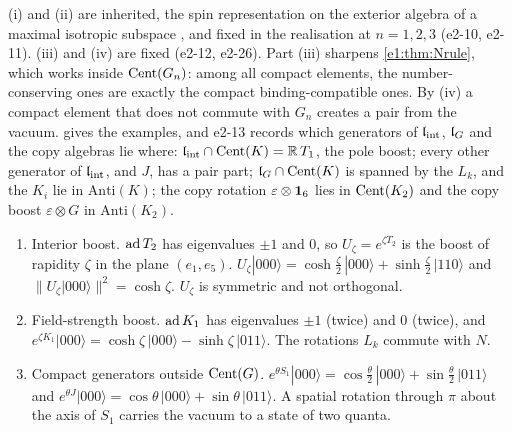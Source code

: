 (i) and (ii) are inherited, the spin representation on the exterior algebra of a maximal isotropic subspace \cite{Chevalley54}, and fixed
in the realisation at $n=1,2,3$ (e2-10, e2-11). (iii) and (iv) are fixed (e2-12, e2-26). Part (iii) sharpens \cref{e1:thm:Nrule}, which works
inside $\operatorname{Cent}(G_n)$: among all compact elements, the number-conserving ones are exactly the compact binding-compatible ones. By (iv) a
compact element that does not commute with $G_n$ creates a pair from the vacuum.  gives the examples, and
e2-13 records which generators of $\mathfrak l_{\rm int}$, $\mathfrak l_G$ and the copy algebras lie where: $\mathfrak l_{\rm int}\cap\operatorname{Cent}(K)=\mathbb{R}\,T_1$, the pole boost; every
other generator of $\mathfrak l_{\rm int}$, and $J$, has a pair part; $\mathfrak l_G\cap\operatorname{Cent}(K)$ is spanned by the $L_k$, and the $K_i$ lie in $\mathrm{Anti}(K)$; the copy
rotation $\varepsilon\otimes\mathbf 1_6$ lies in $\operatorname{Cent}(K_2)$ and the copy boost $\varepsilon\otimes G$ in $\mathrm{Anti}(K_2)$.

\begin{proposition}
\label{e2:prop:bogo}
\begin{enumerate}[label=(\roman*),leftmargin=2.2em]
\item Interior boost. $\operatorname{ad} T_2$ has eigenvalues $\pm1$ and $0$, so $U_\zeta=e^{\zeta T_2}$ is the boost of rapidity $\zeta$ in the plane
$(e_1,e_5)$. $U_\zeta|000\rangle=\cosh\tfrac\zeta2\,|000\rangle+\sinh\tfrac\zeta2\,|110\rangle$ and $\|U_\zeta|000\rangle\|^2=\cosh\zeta$. $U_\zeta$ is symmetric and not
orthogonal.
\item Field-strength boost. $\operatorname{ad} K_1$ has eigenvalues $\pm1$ (twice) and $0$ (twice), and
$e^{\zeta K_1}|000\rangle=\cosh\zeta\,|000\rangle-\sinh\zeta\,|011\rangle$. The rotations $L_k$ commute with $N$.
\item Compact generators outside $\operatorname{Cent}(G)$. $e^{\theta S_1}|000\rangle=\cos\tfrac\theta2\,|000\rangle+\sin\tfrac\theta2\,|011\rangle$ and
$e^{\theta J}|000\rangle=\cos\theta\,|000\rangle+\sin\theta\,|011\rangle$. A spatial rotation through $\pi$ about the axis of $S_1$ carries the vacuum to a state
of two quanta.
\end{enumerate}
\end{proposition}

